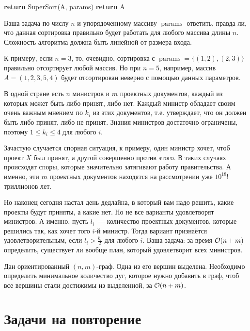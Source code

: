 \documentclass[addpoints]{exam}
\newcommand{\var}[1]{{\ttfamily#1}}
\DeclareMathOperator{\finished}{finished}
\DeclareMathOperator{\params}{params}
\begin{document}
\begin{questions}
\begin{algorithm}[H]
\begin{algorithmic}[1]
    \If{$\finished = 0$}
      \State \textbf{return} \var{SuperSort}(\var{A}, \var{params})
    \Else
      \State \textbf{return} \var{A}
    \EndIf
    
    \EndFunction
  \end{algorithmic}
\end{algorithm}

Ваша задача по числу $n$ и упорядоченному массиву $\params$ ответить, правда ли, что данная сортировка правильно будет работать для любого массива длины $n$. Сложность алгоритма должна быть линейной от размера входа.

К примеру, если $n=3$, то, очевидно, сортировка с $\params = \{(1,2),(2,3)\}$ правильно отсортирует любой массив. Но при $n=5$, например, массив $A=(1,2,3,5,4)$ будет отсортирован неверно с помощью данных параметров.

\question[1 \half] В одной стране есть $n$ министров и $m$ проектных документов, каждый из которых может быть либо принят, либо нет. Каждый министр обладает своим очень важным мнением по $k_i$ из этих документов, т.е. утверждает, что он должен быть либо принят, либо не принят. Знания министров достаточно ограничены, поэтому $1 \leqslant k_i \leqslant 4$ для любого $i$. 

Зачастую случается спорная ситуация, к примеру, один министр хочет, чтоб проект $X$ был принят, а другой совершенно против этого. В таких случаях происходят споры, которые значительно затягивают работу правительства. А именно, эти $m$ проектных документов находятся на рассмотрении уже $10^{18}!$ триллионов лет.

Но наконец сегодня настал день дедлайна, в который вам надо решить, какие проекты будут приняты, а какие нет. Но не все варианты удовлетворят министров. А именно, пусть $l_i$~--- количество проектных документов, которые решились так, как хочет того $i$-й министр. Тогда вариант признаётся удовлетворительным, если $l_i > \frac{k_i}{2}$ для любого $i$. Ваша задача: за время $\mathcal{O}(n+m)$ определить, существует ли вообще план, который удовлетворит всех министров.

\question[1] \label{connectify} Дан ориентированный $(n,m)$-граф. Одна из его вершин выделена. Необходимо определить минимальное количество дуг, которое нужно добавить в граф, чтоб все вершины стали достижимы из выделенной, за $\mathcal{O}(n+m)$.

\section{Задачи на повторение}


\end{questions}
\end{document}
